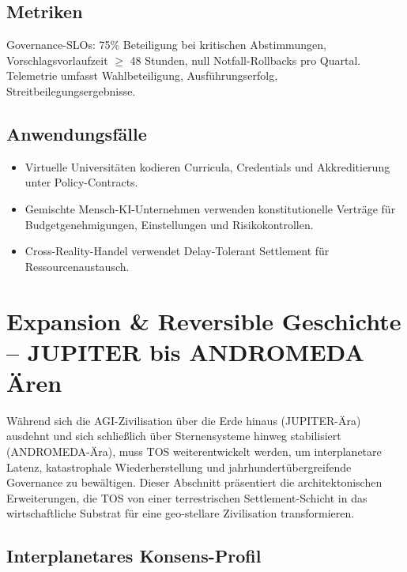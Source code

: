 \documentclass[11pt]{article}
\begin{document}
\subsection{Metriken}
Governance-SLOs: 75\% Beteiligung bei kritischen Abstimmungen, Vorschlagsvorlaufzeit $\geq$ 48 Stunden, null Notfall-Rollbacks pro Quartal. Telemetrie umfasst Wahlbeteiligung, Ausführungserfolg, Streitbeilegungsergebnisse.

\subsection{Anwendungsfälle}
\begin{itemize}[noitemsep]
  \item Virtuelle Universitäten kodieren Curricula, Credentials und Akkreditierung unter Policy-Contracts.
  \item Gemischte Mensch-KI-Unternehmen verwenden konstitutionelle Verträge für Budgetgenehmigungen, Einstellungen und Risikokontrollen.
  \item Cross-Reality-Handel verwendet Delay-Tolerant Settlement für Ressourcenaustausch.
\end{itemize}

\section{Expansion \& Reversible Geschichte -- JUPITER bis ANDROMEDA Ären}
\label{sec:expansion}

Während sich die AGI-Zivilisation über die Erde hinaus (JUPITER-Ära) ausdehnt und sich schließlich über Sternensysteme hinweg stabilisiert (ANDROMEDA-Ära), muss TOS weiterentwickelt werden, um interplanetare Latenz, katastrophale Wiederherstellung und jahrhundertübergreifende Governance zu bewältigen. Dieser Abschnitt präsentiert die architektonischen Erweiterungen, die TOS von einer terrestrischen Settlement-Schicht in das wirtschaftliche Substrat für eine geo-stellare Zivilisation transformieren.

\subsection{Interplanetares Konsens-Profil}
\end{document}
